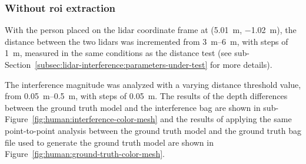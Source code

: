\subsubsection{Without \acs{roi} extraction}
With the person placed on the \ac{lidar} coordinate frame at (\SI{5.01}{\meter}, \SI{-1.02}{\meter}), the distance between the two \acp{lidar} was incremented from \SIrange{3}{6}{\meter}, with steps of \SI{1}{\meter}, measured in the same conditions as the distance test (see sub-Section~\ref{subsec:lidar-interference:parameters-under-test} for more details). 

The interference magnitude was analyzed with a varying distance threshold value, from \SIrange{0.05}{0.5}{\meter}, with steps of \SI{0.05}{\meter}. The results of the depth differences between the ground truth model and the interference bag are shown in sub-Figure~\ref{fig:human:interference-color-mesh} and the results of applying the same point-to-point analysis between the ground truth model and the ground truth bag file used to generate the ground truth model are shown in Figure~\ref{fig:human:ground-truth-color-mesh}.

